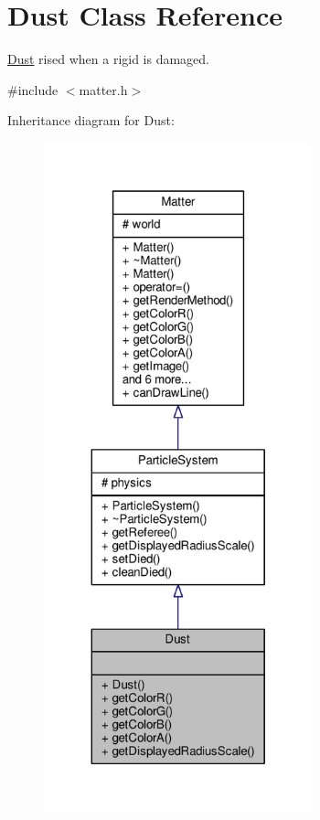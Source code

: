 \hypertarget{classDust}{}\section{Dust Class Reference}
\label{classDust}


\hyperlink{classDust}{Dust} rised when a rigid is damaged.  




{\ttfamily \#include $<$matter.\+h$>$}



Inheritance diagram for Dust\+:\nopagebreak
\begin{figure}[H]
\begin{center}
\leavevmode
\includegraphics[height=550pt]{classDust__inherit__graph}
\end{center}
\end{figure}


